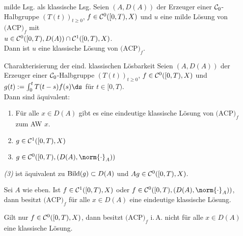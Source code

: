 \linie

\begin{Lemma}{milde Lsg. als klassische Lsg.}
    Seien $(A, D(A))$ der Erzeuger einer $\mathcal{C}_0$-Halbgruppe $(T(t))_{t \ge 0}$,
    $f \in \mathcal{C}^0([0, T), X)$ und $u$ eine milde Lösung von $\text{(ACP)}_f$ mit\\
    $u \in \mathcal{C}^0([0, T), D(A)) \cap \mathcal{C}^1([0, T), X)$.\\
    Dann ist $u$ eine klassische Lösung von $\text{(ACP)}_f$.
\end{Lemma}

\linie

\begin{Satz}{Charakterisierung der eind. klassischen Lösbarkeit}
    Seien $(A, D(A))$ der Erzeuger einer $\mathcal{C}_0$-Halbgruppe $(T(t))_{t \ge 0}$,
    $f \in \mathcal{C}^0([0, T), X)$ und $g(t) := \int_0^t T(t-s)f(s)\ds$ für $t \in [0, T)$.\\
    Dann sind äquivalent:
    \begin{enumerate}
        \item
        Für alle $x \in D(A)$ gibt es eine eindeutige klassische Lösung von $\text{(ACP)}_f$
        zum AW $x$.
        
        \item
        $g \in \mathcal{C}^1([0, T), X)$
        
        \item
        $g \in \C^0([0, T), (D(A), \norm{\cdot}_A))$
    \end{enumerate}
\end{Satz}

\begin{Bem}
    \emph{(3)} ist äquivalent zu $\text{Bild}(g) \subset D(A)$ und $Ag \in \mathcal{C}^0([0, T), X)$.
\end{Bem}

\begin{Kor}
    Sei $A$ wie eben.
    Ist $f \in \mathcal{C}^1([0, T), X)$ oder $f \in \C^0([0, T), (D(A), \norm{\cdot}_A))$,
    dann besitzt $\text{(ACP)}_f$ für alle $x \in D(A)$ eine eindeutige klassische Lösung.
\end{Kor}

\begin{Bem}
    Gilt nur $f \in \mathcal{C}^0([0, T), X)$, dann besitzt $\text{(ACP)}_f$ i.\,A. nicht für alle
    $x \in D(A)$ eine klassische Lösung.
\end{Bem}

\linie

